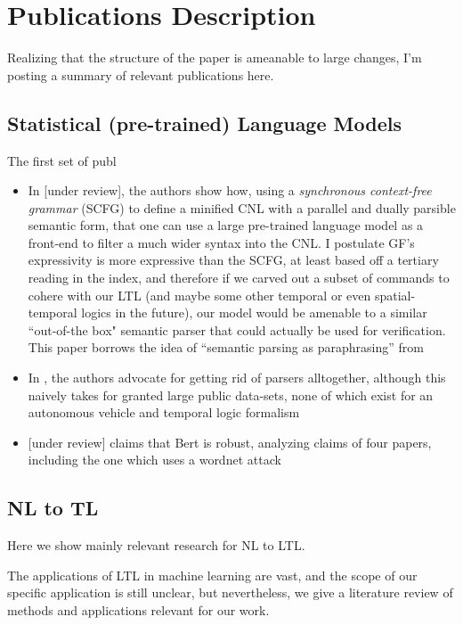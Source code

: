 \documentclass[a4paper, 11pt]{article}
\begin{document}
\section{Publications Description}

Realizing that the structure of the paper is ameanable to large changes, I'm
posting a summary of relevant publications here.

\subsection{Statistical (pre-trained) Language Models}
The first set of publ

\begin{itemize}

\item In \cite{fewShotSem} [under review], the authors show how, using a \emph{synchronous
context-free grammar} (SCFG) to define a minified CNL with a parallel and dually
parsible semantic form, that one can use a large pre-trained language model as a front-end
to filter a much wider syntax into the CNL. I postulate GF's expressivity is
more expressive than the SCFG, at least based off a tertiary reading in the
index, and therefore if we carved out a subset of commands to cohere with our
LTL (and maybe some other temporal or even spatial-temporal logics in the
future), our model would be amenable to a similar ``out-of-the box" semantic
parser that could actually be used for verification. This paper borrows the idea
of ``semantic parsing as paraphrasing'' from  \cite{berant-liang-2014-semantic}

\item In \cite{dontParse}, the authors advocate for getting rid of parsers
  alltogether, although this naively takes for granted large public data-sets,
  none of which exist for an autonomous vehicle and temporal logic formalism
\item  \cite{hauser2021bert} [under review] claims that Bert is robust, analyzing claims of four
  papers, including the one which uses a wordnet attack

\end{itemize}

\subsection{NL to TL}

Here we show mainly relevant research for NL to LTL.

The applications of LTL in machine learning are vast, and the scope of our
specific application is still unclear, but nevertheless, we give a literature
review of methods and applications relevant for our work.
\end{document}
